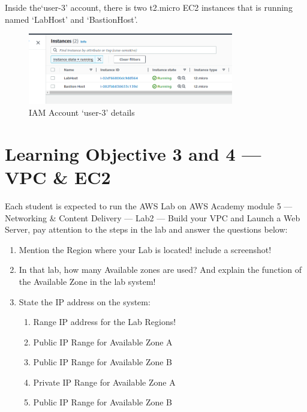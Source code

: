 \documentclass[
  11pt, %
]{assignment}
\begin{document}
Inside the`user-3' account, there is two t2.micro EC2 instances that is running named `LabHost' and `BastionHost'.

\begin{figure}[H]
	\centering
	\includegraphics[width=0.8\textwidth]{graphics/section3/IAMUser3EC2.png}
	\caption{IAM Account `user-3' details}\label{fig:iamloginuser3ec2}
\end{figure}

\pagebreak

\section*{Learning Objective 3 and 4 --- VPC \& EC2}

\begin{problem}
Each student is expected to run the AWS Lab on AWS Academy module 5 --- Networking \& Content Delivery --- Lab2 --- Build your VPC and Launch a Web Server, pay attention to the steps in the lab and answer the questions below:

\medskip

\begin{enumerate}
	\item Mention the Region where your Lab is located! include a screenshot!
	\item In that lab, how many Available zones are used? And explain the function of the Available Zone in the lab system!
	\item State the IP address on the system:
	      \begin{enumerate}
		      \item Range IP address for the Lab Regions!
		      \item Public IP Range for Available Zone A
		      \item Public IP Range for Available Zone B
		      \item Private IP Range for Available Zone A
		      \item Public IP Range for Available Zone B
	      \end{enumerate}
\end{enumerate}
\end{problem}
\end{document}
